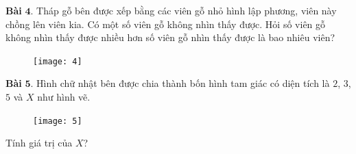 \begin{multicols}{2}
	\textbf{Bài} $\pmb{4.}$ Tháp gỗ bên được xếp bằng các viên gỗ nhỏ hình lập phương, viên này chồng lên viên kia. Có một số viên gỗ không nhìn thấy được.
	\vskip 0.1cm
	Hỏi số viên gỗ không nhìn thấy được nhiều hơn số viên gỗ nhìn thấy được là bao nhiêu viên?
	\begin{figure}[H]
		\centering
		\vspace*{-5pt}
		\captionsetup{labelformat= empty, justification=centering}
		\texttt{[image: 4]}
		\vspace*{-10pt}
	\end{figure}
%	
	\textbf{Bài} $\pmb{5.}$ Hình chữ nhật bên được chia thành bốn hình tam giác có diện tích là $2$, $3$, $5$ và $X$ như hình vẽ.
	\begin{figure}[H]
		\centering
		\vspace*{-5pt}
		\captionsetup{labelformat= empty, justification=centering}
		\texttt{[image: 5]}
		\vspace*{-10pt}
	\end{figure}
	Tính giá trị của $X$?
	\vskip 0.1cm 	 


\end{multicols}
